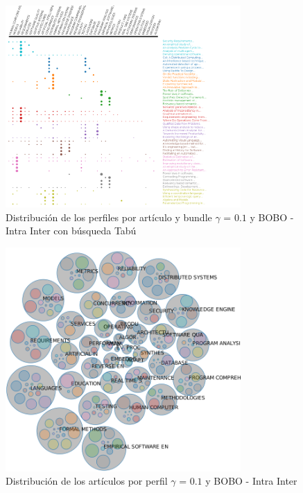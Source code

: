 \begin{figure}[H]
  \centering
    \includegraphics[width=0.8\textwidth]{resultados/papers/BOBO/INTRA_INTER/gamma-with-local-01.png}
  \caption{Distribución de los perfiles por artículo y bundle $\gamma$ = $0.1$ y BOBO - Intra Inter con búsqueda Tabú}
  \label{res:img-papers-gamma01-bobo-intra-inter-tabu}
\end{figure}

\begin{figure}[H]
  \centering
    \includegraphics[width=0.8\textwidth]{resultados/papers/BOBO/INTRA_INTER/bubbles-gamma-01.png}
  \caption{Distribución de los artículos por perfil $\gamma$ = $0.1$ y BOBO - Intra Inter}
  \label{res:img-papers-bubbles-gamma01-bobo-intra-inter}
\end{figure}

